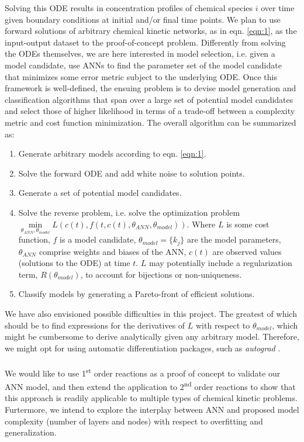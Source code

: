 \documentclass[10pt]{article}
\begin{document}
Solving this ODE results in concentration profiles of chemical species $i$ over time given boundary conditions at initial and/or final time points. We plan to use forward solutions of arbitrary chemical kinetic networks, as in eqn. \ref{eqn:1}, as the input-output dataset to the proof-of-concept problem. Differently from solving the ODEs themselves, we are here interested in model selection, i.e. given a model candidate, use ANNs to find the parameter set of the model candidate that minimizes some error metric subject to the underlying ODE. Once this framework is well-defined, the ensuing problem is to devise model generation and classification algorithms that span over a large set of potential model candidates and select those of higher likelihood in terms of a trade-off between a complexity metric and cost function minimization. The overall algorithm can be summarized as:
\begin{enumerate}
    \item Generate arbitrary models according to eqn. \ref{eqn:1}.
    \item Solve the forward ODE and add white noise to solution points.
    \item Generate a set of potential model candidates.
    \item Solve the reverse problem, i.e. solve the optimization problem $\underset{\theta_{ANN},\theta_{model}}{\min} L(c(t),f(t,c(t),\theta_{ANN},\theta_{model}))$. Where $L$ is some cost function, $f$ is a model candidate, $\theta_{model}=\{k_j\}$ are the model parameters, $\theta_{ANN}$ comprise weights and biases of the ANN, $c(t)$ are observed values (solutions to the ODE) at time $t$. $L$ may potentially include a regularization term, $R(\theta_{model})$, to account for bijections or non-uniqueness. 
    \item Classify models by generating a Pareto-front of efficient solutions.
\end{enumerate}
\medskip
We have also envisioned possible difficulties in this project. The greatest of which should be to find expressions for the derivatives of $L$ with respect to $\theta_{model}$, which might be cumbersome to derive analytically given any arbitrary model. Therefore, we might opt for using automatic differentiation packages, such as \textit{autograd}  \textcolor{red}{}. 
\\ \\
We would like to use 1\textsuperscript{st} order reactions as a proof of concept to validate our ANN model, and then extend the application to 2\textsuperscript{nd} order reactions to show that this approach is readily applicable to multiple types of chemical kinetic problems. Furtermore, we intend to explore the interplay between ANN and proposed model complexity (number of layers and nodes) with respect to overfitting and generalization.

\end{document}
